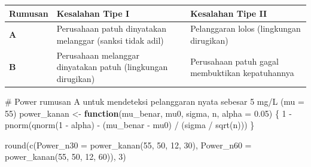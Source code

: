 \documentclass[
  indonesian,
  letterpaper,
]{book}
\newenvironment{Shaded}{\begin{snugshade}}{\end{snugshade}}
\newcommand{\AttributeTok}[1]{\textcolor[rgb]{0.40,0.45,0.13}{#1}}
\newcommand{\CommentTok}[1]{\textcolor[rgb]{0.37,0.37,0.37}{#1}}
\newcommand{\ControlFlowTok}[1]{\textcolor[rgb]{0.00,0.23,0.31}{\textbf{#1}}}
\newcommand{\DecValTok}[1]{\textcolor[rgb]{0.68,0.00,0.00}{#1}}
\newcommand{\FloatTok}[1]{\textcolor[rgb]{0.68,0.00,0.00}{#1}}
\newcommand{\FunctionTok}[1]{\textcolor[rgb]{0.28,0.35,0.67}{#1}}
\newcommand{\NormalTok}[1]{\textcolor[rgb]{0.00,0.23,0.31}{#1}}
\newcommand{\OtherTok}[1]{\textcolor[rgb]{0.00,0.23,0.31}{#1}}
\newcommand{\SpecialCharTok}[1]{\textcolor[rgb]{0.37,0.37,0.37}{#1}}
\newcounter{none} %
\begin{document}
{\def\LTcaptype{none} %
\begin{longtable}[]{@{}
  >{\raggedright\arraybackslash}p{}
  >{\raggedright\arraybackslash}p{}
  >{\raggedright\arraybackslash}p{}@{}}
\toprule\noalign{}
\begin{minipage}[b]{\linewidth}\raggedright
Rumusan
\end{minipage} & \begin{minipage}[b]{\linewidth}\raggedright
Kesalahan Tipe I
\end{minipage} & \begin{minipage}[b]{\linewidth}\raggedright
Kesalahan Tipe II
\end{minipage} \\
\midrule\noalign{}
\endhead
\bottomrule\noalign{}
\endlastfoot
\textbf{A} & Perusahaan patuh dinyatakan melanggar (sanksi tidak adil) &
Pelanggaran lolos (lingkungan dirugikan) \\
\textbf{B} & Perusahaan melanggar dinyatakan patuh (lingkungan
dirugikan) & Perusahaan patuh gagal membuktikan kepatuhannya \\
\end{longtable}
}

\begin{Shaded}
\begin{Highlighting}[]
\CommentTok{\# Power rumusan A untuk mendeteksi pelanggaran nyata sebesar 5 mg/L (mu = 55)}
\NormalTok{power\_kanan }\OtherTok{\textless{}{-}} \ControlFlowTok{function}\NormalTok{(mu\_benar, mu0, sigma, n, }\AttributeTok{alpha =} \FloatTok{0.05}\NormalTok{) \{}
  \DecValTok{1} \SpecialCharTok{{-}} \FunctionTok{pnorm}\NormalTok{(}\FunctionTok{qnorm}\NormalTok{(}\DecValTok{1} \SpecialCharTok{{-}}\NormalTok{ alpha) }\SpecialCharTok{{-}}\NormalTok{ (mu\_benar }\SpecialCharTok{{-}}\NormalTok{ mu0) }\SpecialCharTok{/}\NormalTok{ (sigma }\SpecialCharTok{/} \FunctionTok{sqrt}\NormalTok{(n)))}
\NormalTok{\}}

\FunctionTok{round}\NormalTok{(}\FunctionTok{c}\NormalTok{(}\AttributeTok{Power\_n30 =} \FunctionTok{power\_kanan}\NormalTok{(}\DecValTok{55}\NormalTok{, }\DecValTok{50}\NormalTok{, }\DecValTok{12}\NormalTok{, }\DecValTok{30}\NormalTok{),}
        \AttributeTok{Power\_n60 =} \FunctionTok{power\_kanan}\NormalTok{(}\DecValTok{55}\NormalTok{, }\DecValTok{50}\NormalTok{, }\DecValTok{12}\NormalTok{, }\DecValTok{60}\NormalTok{)), }\DecValTok{3}\NormalTok{)}
\end{Highlighting}
\end{Shaded}
\end{document}
